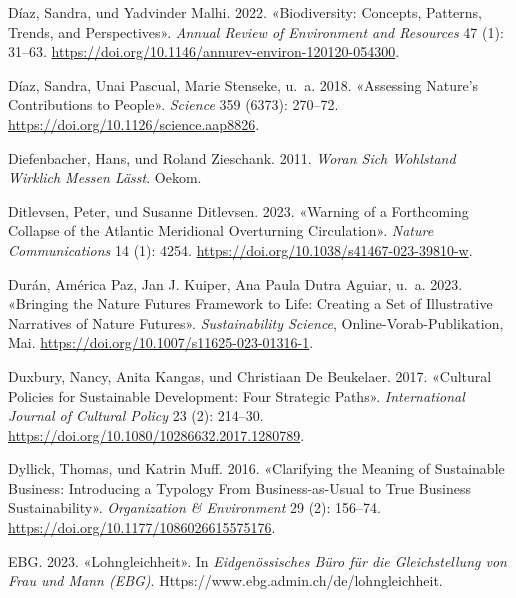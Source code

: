 \documentclass[
  nswissgerman,
  a4paper,
  openany]{book}
\newlength{\cslhangindent}
\newenvironment{CSLReferences}[2] %
 {\begin{list}{}{%
  \setlength{\itemindent}{0pt}
  \setlength{\leftmargin}{0pt}
  \setlength{\parsep}{0pt}
  \ifodd #1
   \setlength{\leftmargin}{\cslhangindent}
   \setlength{\itemindent}{-1\cslhangindent}
  \fi
  \setlength{\itemsep}{#2\baselineskip}}}
 {\end{list}}
\begin{document}
\begin{CSLReferences}{1}{1}
Díaz, Sandra, und Yadvinder Malhi. 2022. {«Biodiversity: {Concepts},
{Patterns}, {Trends}, and {Perspectives}»}. \emph{Annual Review of
Environment and Resources} 47 (1): 31--63.
\url{https://doi.org/10.1146/annurev-environ-120120-054300}.

{Díaz, Sandra, Unai Pascual, Marie Stenseke, u.~a.} 2018. {«Assessing
Nature's Contributions to People»}. \emph{Science} 359 (6373): 270--72.
\url{https://doi.org/10.1126/science.aap8826}.

Diefenbacher, Hans, und Roland Zieschank. 2011. \emph{Woran Sich
{Wohlstand} Wirklich Messen Lässt}. Oekom.

Ditlevsen, Peter, und Susanne Ditlevsen. 2023. {«Warning of a
Forthcoming Collapse of the {Atlantic} Meridional Overturning
Circulation»}. \emph{Nature Communications} 14 (1): 4254.
\url{https://doi.org/10.1038/s41467-023-39810-w}.

Durán, América Paz, Jan J. Kuiper, Ana Paula Dutra Aguiar, u.~a. 2023.
{«Bringing the {Nature Futures Framework} to Life: Creating a Set of
Illustrative Narratives of Nature Futures»}. \emph{Sustainability
Science}, Online-Vorab-Publikation, Mai.
\url{https://doi.org/10.1007/s11625-023-01316-1}.

Duxbury, Nancy, Anita Kangas, und Christiaan De Beukelaer. 2017.
{«Cultural Policies for Sustainable Development: Four Strategic Paths»}.
\emph{International Journal of Cultural Policy} 23 (2): 214--30.
\url{https://doi.org/10.1080/10286632.2017.1280789}.

Dyllick, Thomas, und Katrin Muff. 2016. {«Clarifying the {Meaning} of
{Sustainable Business}: {Introducing} a {Typology From
Business-as-Usual} to {True Business Sustainability}»}.
\emph{Organization \& Environment} 29 (2): 156--74.
\url{https://doi.org/10.1177/1086026615575176}.

EBG. 2023. {«Lohngleichheit»}. In \emph{Eidgen{ö}ssisches B{ü}ro f{ü}r
die Gleichstellung von Frau und Mann (EBG)}.
Https://www.ebg.admin.ch/de/lohngleichheit.


\end{CSLReferences}
\end{document}

